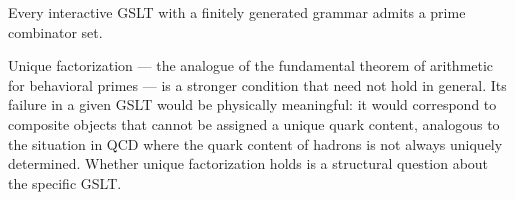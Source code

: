 \begin{conjecture}
Every interactive GSLT with a finitely generated grammar admits a
prime combinator set.
\end{conjecture}

\begin{remark}
Unique factorization --- the analogue of the fundamental theorem of
arithmetic for behavioral primes --- is a stronger condition that
need not hold in general.
Its failure in a given GSLT would be physically meaningful:
it would correspond to composite objects that cannot be assigned a
unique quark content, analogous to the situation in QCD where
the quark content of hadrons is not always uniquely determined.
Whether unique factorization holds is a structural question about
the specific GSLT.
\end{remark}

